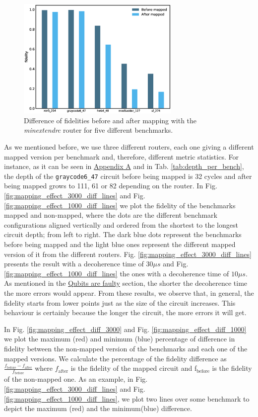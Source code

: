 \begin{figure}[htbp]
\centering
\includegraphics[width=0.7\textwidth]{figures/f_diff_bar_plot.eps}
\caption{\label{fig:f_diff_bar_plot}
Difference of fidelities before and after mapping with the \emph{minextendrc} router for five different benchmarks.}
\end{figure}
As we mentioned before, we use three different routers, each one giving a different mapped version per benchmark and, therefore, different metric statistics.
For instance, as it can be seen in \href{appendix-1.org}{Appendix A} and in Tab. \ref{tab:depth_per_bench}, the depth of the \texttt{graycode6\_47} circuit before being mapped is 32 cycles and after being mapped grows to 111, 61 or 82 depending on the router.
In Fig. \ref{fig:mapping_effect_3000_diff_lines} and Fig. \ref{fig:mapping_effect_1000_diff_lines} we plot the fidelity of the benchmarks mapped and non-mapped, where the dots are the different benchmark configurations aligned vertically and ordered from the shortest to the longest circuit depth; from left to right.
The dark blue dots represent the benchmarks before being mapped and the light blue ones represent the different mapped version of it from the different routers.
Fig. \ref{fig:mapping_effect_3000_diff_lines} presents the result with a decoherence time of \(30 \mu s\) and Fig. \ref{fig:mapping_effect_1000_diff_lines} the ones with a decoherence time of \(10 \mu s\).
As mentioned in the \href{quantum_computing.org}{Qubits are faulty} section, the shorter the decoherence time the more errors would appear.
From these results, we observe that, in general, the fidelity starts from lower points just as the size of the circuit increases.
This behaviour is certainly because the longer the circuit, the more errors it will get.

In Fig. \ref{fig:mapping_effect_diff_3000} and Fig. \ref{fig:mapping_effect_diff_1000} we plot the maximum (red) and minimum (blue) percentage of difference in fidelity between the non-mapped version of the benchmarks and each one of the mapped versions.
We calculate the percentage of the fidelity difference as \(\frac{f_{\text{before}} - f_{\text{after}}}{f_{\text{before}}}\) where \(f_{\text{after}}\) is the fidelity of the mapped circuit and f\(_{\text{before}}\) is the fidelity of the non-mapped one.
As an example, in Fig. \ref{fig:mapping_effect_3000_diff_lines} and Fig. \ref{fig:mapping_effect_1000_diff_lines}, we plot two lines over some benchmark to depict the maximum (red) and the minimum(blue) difference.

